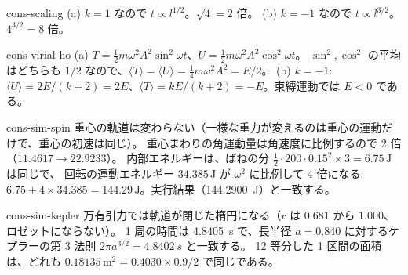 \begin{solution}{cons-scaling}
(a) $k=1$ なので $t\propto l^{1/2}$。$\sqrt4=2$ 倍。
(b) $k=-1$ なので $t\propto l^{3/2}$。$4^{3/2}=8$ 倍。
\end{solution}

\begin{solution}{cons-virial-ho}
(a) $T=\tfrac12m\omega^2A^2\sin^2\omega t$、$U=\tfrac12m\omega^2A^2\cos^2\omega t$。
$\sin^2,\cos^2$ の平均はどちらも $1/2$ なので、$\langle T\rangle=\langle U\rangle=\tfrac14m\omega^2A^2=E/2$。
(b) $k=-1$: $\langle U\rangle=2E/(k+2)=2E$、$\langle T\rangle=kE/(k+2)=-E$。束縛運動では $E<0$ である。
\end{solution}

\begin{solution}{cons-sim-spin}
重心の軌道は変わらない（一様な重力が変えるのは重心の運動だけで、重心の初速は同じ）。
重心まわりの角運動量は角速度に比例するので 2 倍（$11.4617\to22.9233$）。
内部エネルギーは、ばねの分 $\tfrac12\cdot200\cdot0.15^2\times3=6.75\,\mathrm{J}$ は同じで、
回転の運動エネルギー $34.385\,\mathrm{J}$ が $\omega^2$ に比例して 4 倍になる:
$6.75+4\times34.385=144.29\,\mathrm{J}$。実行結果（\qty{144.2900}{J}）と一致する。
\end{solution}

\begin{solution}{cons-sim-kepler}
万有引力では軌道が閉じた楕円になる（$r$ は $0.681$ から $1.000$、ロゼットにならない）。
1 周の時間は \qty{4.8405}{s} で、長半径 $a=0.840$ に対するケプラーの第 3 法則 $2\pi a^{3/2}=\qty{4.8402}{s}$ と一致する。
12 等分した 1 区間の面積は、どれも $0.18135\,\mathrm{m^2}=0.4030\times0.9/2$ で同じである。
\end{solution}
